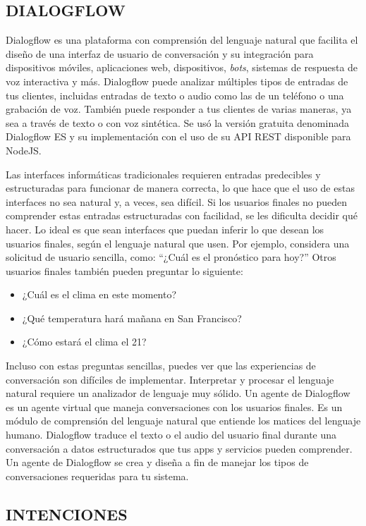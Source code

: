 \documentclass[letter, openright, 12pt]{book}
\begin{document}
\subsection{DIALOGFLOW}
Dialogflow es una plataforma con comprensión del lenguaje natural que facilita el diseño de una interfaz de usuario de conversación y su integración para dispositivos móviles, aplicaciones web, dispositivos, \textit{bots}, sistemas de respuesta de voz interactiva y más.  Dialogflow puede analizar múltiples tipos de entradas de tus clientes, incluidas entradas de texto o audio como las de un teléfono o una grabación de voz. También puede responder a tus clientes de varias maneras, ya sea a través de texto o con voz sintética. Se usó la versión gratuita denominada Dialogflow ES y su implementación con el uso de su API REST disponible para NodeJS. 
\par 
Las interfaces informáticas tradicionales requieren entradas predecibles y estructuradas para funcionar de manera correcta, lo que hace que el uso de estas interfaces no sea natural y, a veces, sea difícil. Si los usuarios finales no pueden comprender estas entradas estructuradas con facilidad, se les dificulta decidir qué hacer. Lo ideal es que sean interfaces que puedan inferir lo que desean los usuarios finales, según el lenguaje natural que usen. Por ejemplo, considera una solicitud de usuario sencilla, como: “¿Cuál es el pronóstico para hoy?” Otros usuarios finales también pueden preguntar lo siguiente:
\begin{itemize}
\item ¿Cuál es el clima en este momento?
\item ¿Qué temperatura hará mañana en San Francisco?
\item ¿Cómo estará el clima el 21?
\end{itemize}
Incluso con estas preguntas sencillas, puedes ver que las experiencias de conversación son difíciles de implementar. Interpretar y procesar el lenguaje natural requiere un analizador de lenguaje muy sólido.
Un agente de Dialogflow es un agente virtual que maneja conversaciones con los usuarios finales. Es un módulo de comprensión del lenguaje natural que entiende los matices del lenguaje humano. Dialogflow traduce el texto o el audio del usuario final durante una conversación a datos estructurados que tus apps y servicios pueden comprender. Un agente de Dialogflow se crea y diseña a fin de manejar los tipos de conversaciones requeridas para tu sistema.

\subsection{INTENCIONES}
\end{document}
